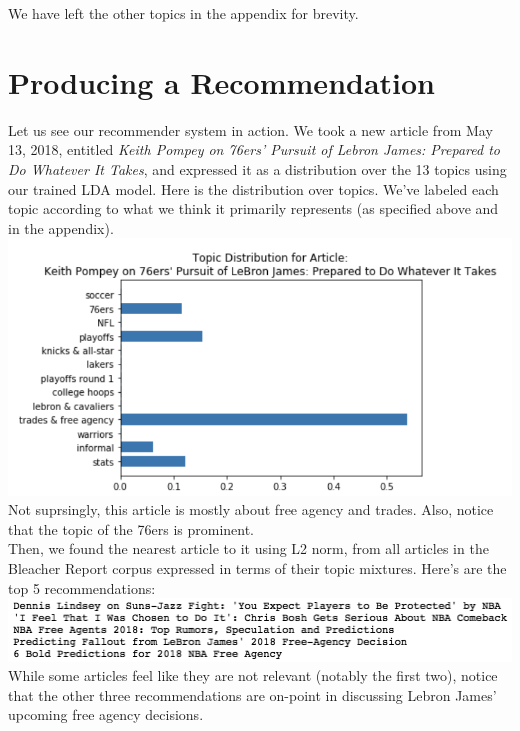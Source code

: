 \documentclass[11pt]{article}
\begin{document}
We have left the other topics in the appendix for brevity.

\section{Producing a Recommendation}
Let us see our recommender system in action.  We took a new article from May 13, 2018, entitled \textit{Keith Pompey on 76ers' Pursuit of Lebron James: Prepared to Do Whatever It Takes}, and expressed it as a distribution over the 13 topics using our trained LDA model.  Here is the distribution over topics.  We've labeled each topic according to what we think it primarily represents (as specified above and in the appendix). \\

\includegraphics{newarttopics.png}\\

Not suprsingly, this article is mostly about free agency and trades. Also, notice that the topic of the 76ers is prominent. \\

Then, we found the nearest article to it using L2 norm, from all articles in the Bleacher Report corpus expressed in terms of their topic mixtures. Here's are the top 5 recommendations: \\
 
 \includegraphics{preds.png}\\
 
 While some articles feel like they are not relevant (notably the first two), notice that the other three recommendations are on-point in discussing Lebron James' upcoming free agency decisions. 
\end{document}
